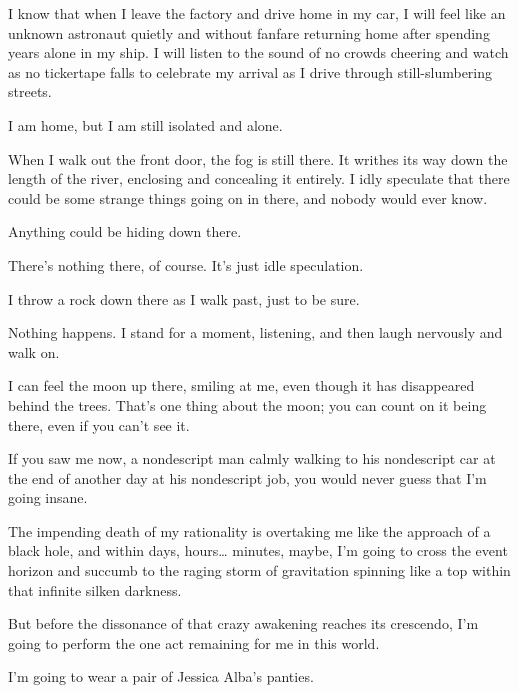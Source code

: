 I know that when I leave the factory and drive home in my car, I
will feel like an unknown astronaut quietly and without fanfare
returning home after spending years alone in my ship. I will listen
to the sound of no crowds cheering and watch as no tickertape falls
to celebrate my arrival as I drive through still-slumbering
streets.



I am home, but I am still isolated and alone.



When I walk out the front door, the fog is still there. It writhes
its way down the length of the river, enclosing and concealing it
entirely. I idly speculate that there could be some strange things
going on in there, and nobody would ever know.



Anything could be hiding down there.



There's nothing there, of course. It's just idle
speculation.



I throw a rock down there as I walk past, just to be sure.



Nothing happens. I stand for a moment, listening, and then laugh
nervously and walk on.



I can feel the moon up there, smiling at me, even though it has
disappeared behind the trees. That's one thing about the
moon; you can count on it being there, even if you can't see
it.



If you saw me now, a nondescript man calmly walking to his
nondescript car at the end of another day at his nondescript job,
you would never guess that I'm going insane.



The impending death of my rationality is overtaking me like the
approach of a black hole, and within days, hours{\ldots} minutes,
maybe, I'm going to cross the event horizon and succumb to
the raging storm of gravitation spinning like a top within that
infinite silken darkness.



But before the dissonance of that crazy awakening reaches its
crescendo, I'm going to perform the one act remaining for me
in this world.



I'm going to wear a pair of Jessica Alba's
panties.



